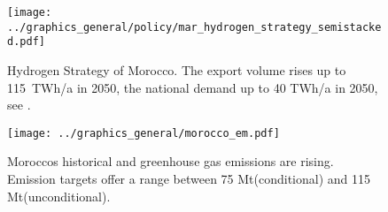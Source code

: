 \begin{figure}
    \centering
    \texttt{[image: ../graphics\_general/policy/mar\_hydrogen\_strategy\_semistacked.pdf]}
    \caption{Hydrogen Strategy of Morocco. The export volume rises up to 115~TWh/a in 2050, the national demand up to 40 TWh/a in 2050, see \cite{MarHyStrat2021}.}
    \label{fig:mar_hydrogen_strategy}
\end{figure}


\begin{figure}[h!]
    \centering
    \texttt{[image: ../graphics\_general/morocco\_em.pdf]}
    \caption{Moroccos historical \co and greenhouse gas emissions are rising. Emission targets offer a range between 75 Mt\coe (conditional) and 115 Mt\coe (unconditional).}
    \label{fig:morocco_em}
\end{figure}
